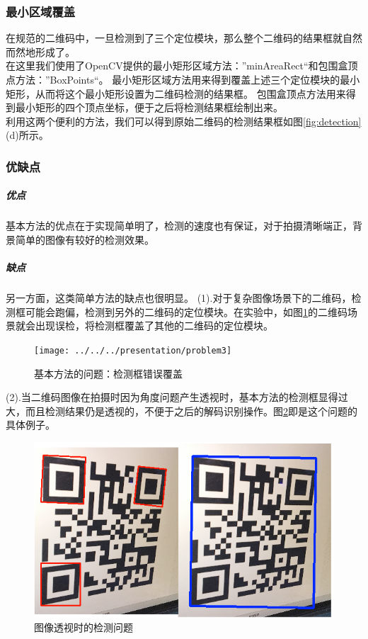 \subsubsection{最小区域覆盖}
在规范的二维码中，一旦检测到了三个定位模块，那么整个二维码的结果框就自然而然地形成了。\\
在这里我们使用了OpenCV提供的最小矩形区域方法：”minAreaRect“和包围盒顶点方法：”BoxPoints“。
最小矩形区域方法用来得到覆盖上述三个定位模块的最小矩形，从而将这个最小矩形设置为二维码检测的结果框。
包围盒顶点方法用来得到最小矩形的四个顶点坐标，便于之后将检测结果框绘制出来。\\
利用这两个便利的方法，我们可以得到原始二维码的检测结果框如图\ref{fig:detection}(d)所示。
\subsubsection{优缺点}
\subparagraph{优点}
基本方法的优点在于实现简单明了，检测的速度也有保证，对于拍摄清晰端正，背景简单的图像有较好的检测效果。
\subparagraph{缺点}
另一方面，这类简单方法的缺点也很明显。
(1).对于复杂图像场景下的二维码，检测框可能会跑偏，检测到另外的二维码的定位模块。在实验中，如图\ref{fig:problem1}的二维码场景就会出现误检，将检测框覆盖了其他的二维码的定位模块。
\begin{figure}[h]
\centering
\texttt{[image: ../../../presentation/problem3]}
\caption[problem1]{基本方法的问题：检测框错误覆盖}
\label{fig:problem1}
\end{figure}
(2).当二维码图像在拍摄时因为角度问题产生透视时，基本方法的检测框显得过大，而且检测结果仍是透视的，不便于之后的解码识别操作。图\ref{fig:perspectiveproblem}即是这个问题的具体例子。
\begin{figure}[h]
\centering
\includegraphics[width=0.9\linewidth]{perspective_problem}
\caption[problem2]{图像透视时的检测问题}
\label{fig:perspectiveproblem}
\end{figure}
